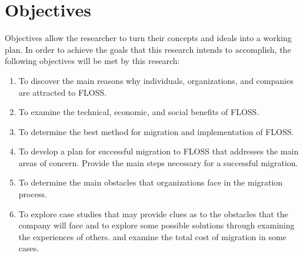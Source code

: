\section{Objectives}
Objectives allow the researcher to turn their concepts and ideals into a working plan. In order to achieve the goals that this research intends to accomplish, the following objectives will be met by this research:

\begin{enumerate}
\item To discover the main reasons why individuals, organizations, and companies are attracted to FLOSS. 
\item To examine the technical, economic, and social benefits of FLOSS.
\item To determine the best method for migration and implementation of FLOSS.
\item To develop a plan for successful migration to FLOSS that addresses the main areas of concern. Provide the main steps necessary for a successful migration.
\item To determine  the main obstacles that organizations face in the migration process.
\item To explore case studies that may provide clues as to the obstacles that the company will face and to explore some possible solutions through examining the experiences of others. and examine the total cost of migration in some cases.
\end{enumerate}
